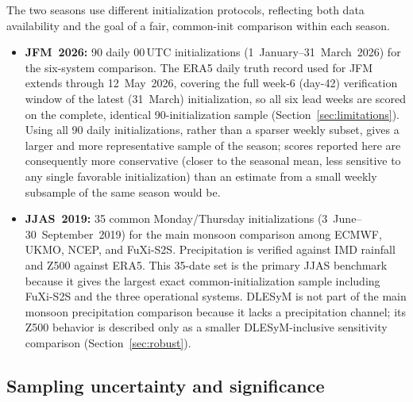 \documentclass[11pt,a4paper]{article}
\begin{document}
The two seasons use different initialization protocols, reflecting both data
availability and the goal of a fair, common-init comparison within each
season.
\begin{itemize}\setlength{\itemsep}{1pt}
  \item \textbf{JFM~2026:} 90 daily 00\,UTC initializations (1~January--31~March~2026)
        for the six-system comparison. The ERA5 daily truth record used for
        JFM extends through 12~May~2026, covering the full week-6 (day-42)
        verification window of the latest (31~March) initialization, so all
        six lead weeks are scored on the complete, identical 90-initialization
        sample (Section~\ref{sec:limitations}). Using all 90 daily
        initializations, rather than a sparser weekly subset, gives a larger
        and more representative sample of the season; scores reported here are
        consequently more conservative (closer to the seasonal mean, less
        sensitive to any single favorable initialization) than an estimate
        from a small weekly subsample of the same season would be.
  \item \textbf{JJAS~2019:} 35 common Monday/Thursday initializations
        (3~June--30~September~2019) for the main monsoon comparison among
        ECMWF, UKMO, NCEP, and FuXi-S2S. Precipitation is verified against IMD
        rainfall and Z500 against ERA5. This 35-date set is the primary JJAS
        benchmark because it gives the largest exact common-initialization
        sample including FuXi-S2S and the three operational systems. DLESyM is
        not part of the main monsoon precipitation comparison because it lacks a
        precipitation channel; its Z500 behavior is described only as a
        smaller DLESyM-inclusive sensitivity comparison
        (Section~\ref{sec:robust}).
\end{itemize}

\subsection{Sampling uncertainty and significance}\label{sec:boot}
\end{document}
